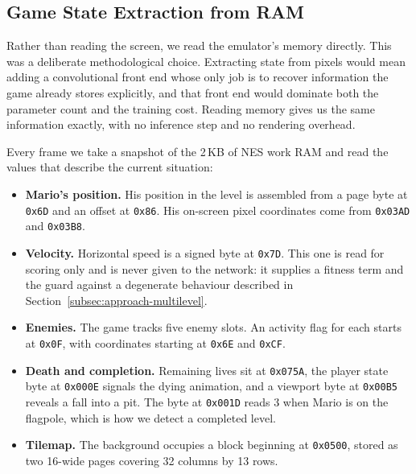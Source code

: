 \subsection{Game State Extraction from RAM}
\label{subsec:ram-extraction}

Rather than reading the screen, we read the emulator's memory directly. This
was a deliberate methodological choice. Extracting state from pixels would mean
adding a convolutional front end whose only job is to recover information the
game already stores explicitly, and that front end would dominate both the
parameter count and the training cost. Reading memory gives us the same
information exactly, with no inference step and no rendering overhead.

\noindent
Every frame we take a snapshot of the 2\,KB of NES work RAM and read the
values that describe the current situation:

\begin{itemize}
    \item \textbf{Mario's position.} His position in the level is assembled
    from a page byte at \texttt{0x6D} and an offset at \texttt{0x86}. His
    on-screen pixel coordinates come from \texttt{0x03AD} and \texttt{0x03B8}.

    \item \textbf{Velocity.} Horizontal speed is a signed byte at
    \texttt{0x7D}. This one is read for scoring only and is never given to the
    network: it supplies a fitness term and the guard against a degenerate
    behaviour described in Section~\ref{subsec:approach-multilevel}.

    \item \textbf{Enemies.} The game tracks five enemy slots. An activity flag
    for each starts at \texttt{0x0F}, with coordinates starting at
    \texttt{0x6E} and \texttt{0xCF}.

    \item \textbf{Death and completion.} Remaining lives sit at
    \texttt{0x075A}, the player state byte at \texttt{0x000E} signals the
    dying animation, and a viewport byte at \texttt{0x00B5} reveals a fall into
    a pit. The byte at \texttt{0x001D} reads 3 when Mario is on the flagpole,
    which is how we detect a completed level.

    \item \textbf{Tilemap.} The background occupies a block beginning at
    \texttt{0x0500}, stored as two 16-wide pages covering 32 columns by 13
    rows.
\end{itemize}

